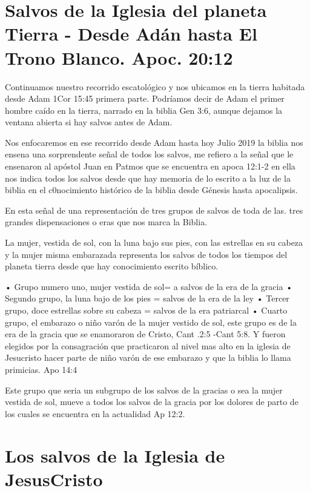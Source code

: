 \documentclass[]{book}
\begin{document}
\hypertarget{salvos-de-la-iglesia-del-planeta-tierra---desde-adan-hasta-el-trono-blanco.-apoc.-2012}{%
\chapter{Salvos de la Iglesia del planeta Tierra - Desde Adán hasta El Trono Blanco. Apoc. 20:12}\label{salvos-de-la-iglesia-del-planeta-tierra---desde-adan-hasta-el-trono-blanco.-apoc.-2012}}

Continuamos nuestro recorrido escatológico y nos ubicamos en la tierra habitada desde Adam 1Cor 15:45 primera parte. Podríamos decir de Adam el primer hombre caído en la tierra, narrado en la biblia Gen 3:6, aunque dejamos la ventana abierta si hay salvos antes de Adam.

Nos enfocaremos en ese recorrido desde Adam hasta hoy Julio 2019 la biblia nos ensena una sorprendente señal de todos los salvos, me refiero a la señal que le ensenaron al apóstol Juan en Patmos que se encuentra en apoca 12:1-2 en ella nos indica todos los salvos desde que hay memoria de lo escrito a la luz de la biblia en el c0nocimiento histórico de la biblia desde Génesis hasta apocalipsis.

En esta señal de una representación de tres grupos de salvos de toda de las. tres grandes dispensaciones o eras que nos marca la Biblia.

La mujer, vestida de sol, con la luna bajo sus pies, con las estrellas en su cabeza y la mujer misma embarazada representa los salvos de todos los tiempos del planeta tierra desde que hay conocimiento escrito bíblico.

• Grupo numero uno, mujer vestida de sol= a salvos de la era de la gracia
• Segundo grupo, la luna bajo de los pies = salvos de la era de la ley
• Tercer grupo, doce estrellas sobre su cabeza = salvos de la era patriarcal
• Cuarto grupo, el embarazo o niño varón de la mujer vestido de sol, este grupo es de la era de la gracia que se enamoraron de Cristo, Cant .2:5 -Cant 5:8. Y fueron elegidos por la consagración que practicaron al nivel mas alto en la iglesia de Jesucristo hacer parte de niño varón de ese embarazo y que la biblia lo llama primicias. Apo 14:4

Este grupo que seria un subgrupo de los salvos de la gracias o sea la mujer vestida de sol, mueve a todos los salvos de la gracia por los dolores de parto de los cuales se encuentra en la actualidad Ap 12:2.

\hypertarget{los-salvos-de-la-iglesia-de-jesuscristo}{%
\chapter{Los salvos de la Iglesia de JesusCristo}\label{los-salvos-de-la-iglesia-de-jesuscristo}}
\end{document}
